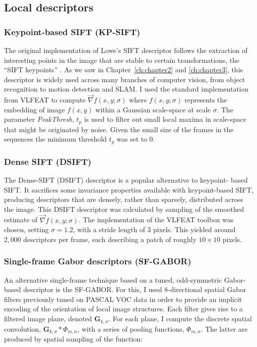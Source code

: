 \subsection{Local descriptors}
\label{sec:descriptors}

\subsubsection{Keypoint-based SIFT (KP-SIFT)}

The original implementation of Lowe's SIFT descriptor follows the extraction of interesting points in the image that are stable to certain transformations, the ``SIFT keypoints'' \cite{Lowe2004}. As we saw in Chapter~\ref{ch:chapter2} and \ref{ch:chapter3}, this descriptor is widely used across many branches of computer vision, from object recognition to motion detection and SLAM. I used the standard implementation from VLFEAT \cite{Vedaldi2008} to compute $\vec{\nabla}f(x,y;\sigma)$ where $f(x,y;\sigma)$ represents the embedding of image $f(x,y)$ within a Gaussian scale-space at scale $\sigma$. The parameter \emph{PeakThresh}, $t_p$ is used to filter out small local maxima in scale-space that might be originated by noise. Given the small size of the frames in the sequences the minimum threshold $t_p$ was set to $0$.

\subsubsection{Dense SIFT (DSIFT)}

The Dense-SIFT (DSIFT) descriptor \citep{Lazebnik2006} is a popular  alternative to keypoint- based SIFT. It sacrifices some invariance properties available with keypoint-based SIFT, producing descriptors that are densely, rather than sparsely, distributed across the image. This DSIFT descriptor was calculated by  sampling of the smoothed estimate of $\vec{\nabla}f(x,y;\sigma)$.  The implementation of the VLFEAT toolbox was chosen, setting $\sigma = 1.2$, with a stride length of 3 pixels. This  yielded around $2,000$ descriptors per frame, each describing a patch of roughly $10 \times 10$ pixels.

\subsubsection{Single-frame Gabor descriptors (SF-GABOR)}
\label{sec:sf-gabor}

An alternative single-frame technique based on a tuned, odd-symmetric Gabor-based descriptor is the SF-GABOR. For this, I used 8-directional spatial Gabor filters previously tuned on PASCAL VOC data \cite{Everingham2009} in order to provide an implicit encoding of the orientation of local image structures.  Each filter gives rise to a filtered image plane, denoted $\mathbf{G}_{k,\sigma}$.  For each plane, I compute the discrete spatial convolution, $\mathbf{G}_{k,\sigma} \ast {\Phi}_{m,n}$, with a series of pooling functions, ${\Phi}_{m,n}$. The latter are produced by spatial sampling of the function:

